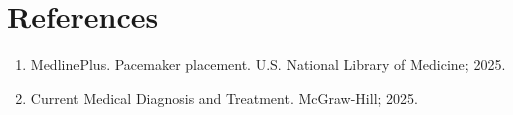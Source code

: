 \section*{References}
\begin{enumerate}
  \item MedlinePlus. Pacemaker placement. U.S. National Library of Medicine; 2025.
  \item Current Medical Diagnosis and Treatment. McGraw-Hill; 2025.
\end{enumerate}

\clearpage
